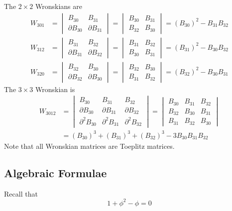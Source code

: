 The $2 \times 2$ Wronskians are
\begin{align}
    W_{301} &= \begin{vmatrix}
        B_{30} & B_{31} \\ \partial B_{30} & \partial B_{31}
    \end{vmatrix} = \begin{vmatrix}
        B_{30} & B_{31} \\ B_{32} & B_{30}
    \end{vmatrix} = \left(B_{30}\right)^{2} - B_{31} B_{32} \\
    W_{312} &= \begin{vmatrix}
        B_{31} & B_{32} \\ \partial B_{31} & \partial B_{32}
    \end{vmatrix} = \begin{vmatrix}
        B_{31} & B_{32} \\ B_{30} & B_{31}
    \end{vmatrix} = \left(B_{31}\right)^{2} - B_{30} B_{32} \\
    W_{320} &= \begin{vmatrix}
        B_{32} & B_{30} \\ \partial B_{32} & \partial B_{30}
    \end{vmatrix} = \begin{vmatrix}
        B_{32} & B_{30} \\ B_{31} & B_{32}
    \end{vmatrix} = \left(B_{32}\right)^{2} - B_{30} B_{31}
\end{align}
The $3 \times 3$ Wronskian is
\begin{align}
    W_{3012} &= \begin{vmatrix}
        B_{30} & B_{31} & B_{32} \\ \partial B_{30} & \partial B_{31} & \partial B_{32} \\ \partial^{2} B_{30} & \partial^{2} B_{31} & \partial^{2} B_{32}
    \end{vmatrix} = \begin{vmatrix}
        B_{30} & B_{31} & B_{32} \\ B_{32} & B_{30} & B_{31} \\ B_{31} & B_{32} & B_{30}
    \end{vmatrix} \\
    &= \left( B_{30} \right)^{3} + \left( B_{31} \right)^{3} + \left( B_{32} \right)^{3} - 3 B_{30} B_{31} B_{32}
\end{align}
Note that all Wronskian matrices are Toeplitz matrices.
\subsection{Algebraic Formulae}
Recall that
\begin{equation}
    1 + \phi^{2} - \phi = 0
\end{equation}